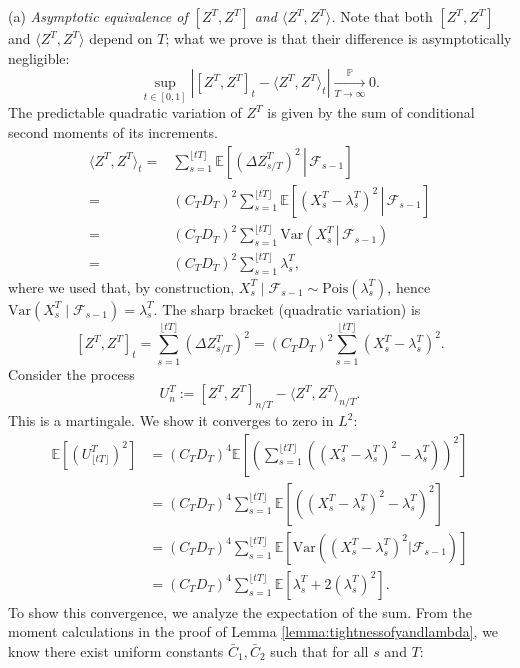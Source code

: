 \documentclass[letterpaper]{article}
\numberwithin{equation}{section}
\theoremstyle{definition}
\theoremstyle{remark}
\begin{document}
{
(a) \textit{Asymptotic equivalence of $[Z^T, Z^T]$ and $\langle Z^T, Z^T \rangle$.}
}
{
Note that both $[Z^T,Z^T]$ and $\langle Z^T,Z^T\rangle$ depend on $T$; what we prove is that their difference is asymptotically negligible:
\[
\sup_{t\in[0,1]}\left|[Z^T,Z^T]_t-\langle Z^T,Z^T\rangle_t\right|\xrightarrow[T\to\infty]{\mathbb P}0.
\]
}
{
The predictable quadratic variation of $Z^T$ is given by the sum of conditional second moments of its increments.
\begin{align*}
  \langle Z^T, Z^T \rangle_t 
  = &\sum_{s=1}^{\lfloor tT \rfloor} \mathbb{E}\!\left[\left.(\Delta Z_{s/T}^T)^2 \,\right|\, \mathcal{F}_{s-1}\right] \\
  = &(C_T D_T)^2 \sum_{s=1}^{\lfloor tT \rfloor} \mathbb{E}\!\left[\left.(X_s^T - \lambda_s^T)^2 \,\right|\, \mathcal{F}_{s-1}\right] \\
  = &(C_T D_T)^2 \sum_{s=1}^{\lfloor tT \rfloor} \mathrm{Var}\!\left(\left.X_s^T \,\right|\, \mathcal{F}_{s-1}\right) \\
  = &(C_T D_T)^2 \sum_{s=1}^{\lfloor tT \rfloor} \lambda_s^T,
\end{align*}
where we used that, by construction, $X_s^T\mid \mathcal{F}_{s-1}\sim \mathrm{Pois}(\lambda_s^T)$, hence $\mathrm{Var}(X_s^T\mid \mathcal{F}_{s-1})=\lambda_s^T$.}
The sharp bracket (quadratic variation) is 
\[
  [Z^T, Z^T]_t = \sum_{s=1}^{\lfloor tT \rfloor} (\Delta Z_{s/T}^T)^2 = (C_T D_T)^2 \sum_{s=1}^{\lfloor tT \rfloor} (X_s^T - \lambda_s^T)^2.
\]
Consider the process 
\[
  U_n^T := [Z^T, Z^T]_{n/T} - \langle Z^T, Z^T \rangle_{n/T}.
\]
This is a martingale. We show it converges to zero in $L^2$:
\begin{align*}
    \mathbb{E}[(U_{\lfloor tT \rfloor}^T)^2] &= (C_T D_T)^4 \mathbb{E}\left[ \left( \sum_{s=1}^{\lfloor tT \rfloor} \left( (X_s^T - \lambda_s^T)^2 - \lambda_s^T \right) \right)^2 \right] \\
    &= (C_T D_T)^4 \sum_{s=1}^{\lfloor tT \rfloor} \mathbb{E}\left[ \left( (X_s^T - \lambda_s^T)^2 - \lambda_s^T \right)^2 \right] \\
    &= (C_T D_T)^4 \sum_{s=1}^{\lfloor tT \rfloor} \mathbb{E}[\text{Var}((X_s^T-\lambda_s^T)^2|\mathcal{F}_{s-1})] \\
    &= (C_T D_T)^4 \sum_{s=1}^{\lfloor tT \rfloor} \mathbb{E}[\lambda_s^T + 2(\lambda_s^T)^2].
\end{align*}
To show this convergence, we analyze the expectation of the sum. From the moment calculations in the proof of Lemma \ref{lemma:tightnessofyandlambda}, we know there exist uniform constants $\bar C_1,\bar C_2$ such that for all $s$ and $T$:
\end{document}
